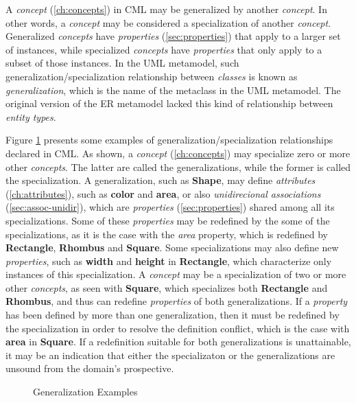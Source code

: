 \begin{definition}
A \emph{concept} (\ref{ch:concepts}) in CML may be generalized by another \emph{concept}.
In other words, a \emph{concept} may be considered a specialization of another \emph{concept}.
Generalized \emph{concepts} have \emph{properties} (\ref{sec:properties})
that apply to a larger set of instances,
while specialized \emph{concepts} have \emph{properties}
that only apply to a subset of those instances.
In the UML \cite{uml} metamodel,
such generalization/specialization relationship between \emph{classes}
is known as \emph{generalization}, which is the name of the metaclass in the UML metamodel.
The original version of the ER \cite{er} metamodel lacked this kind of relationship
between \emph{entity types}.
\end{definition}

\begin{examples}
Figure \ref{fig:ex:generalization} presents some examples of
generalization/specialization relationships declared in CML.
As shown,
a \emph{concept} (\ref{ch:concepts}) may specialize zero or more other \emph{concepts}.
The latter are called the generalizations,
while the former is called the specialization.
A generalization, such as \textbf{Shape},
may define \emph{attributes} (\ref{ch:attributes}),
such as \textbf{color} and \textbf{area},
or also \emph{unidirecional associations} (\ref{sec:assoc-unidir}),
which are \emph{properties} (\ref{sec:properties}) shared among all its specializations.
Some of these \emph{properties} may be redefined by the some of the specializations,
as it is the case with the \emph{area} property,
which is redefined by \textbf{Rectangle}, \textbf{Rhombus} and \textbf{Square}.
Some specializations may also define new \emph{properties},
such as \textbf{width} and \textbf{height} in \textbf{Rectangle},
which characterize only instances of this specialization.
A \emph{concept} may be a specialization of two or more other \emph{concepts},
as seen with \textbf{Square},
which specializes both \textbf{Rectangle} and \textbf{Rhombus},
and thus can redefine \emph{properties} of both generalizations.
If a \emph{property} has been defined by more than one generalization,
then it must be redefined by the specialization
in order to resolve the definition conflict,
which is the case with \textbf{area} in \textbf{Square}. 
If a redefinition suitable for both generalizations is unattainable,
it may be an indication that either the specializaton or the generalizations
are unsound from the domain's prospective.
\end{examples}

\begin{figure}
\verbatimfont{\small}

\caption{Generalization Examples}
\label{fig:ex:generalization}
\end{figure}
